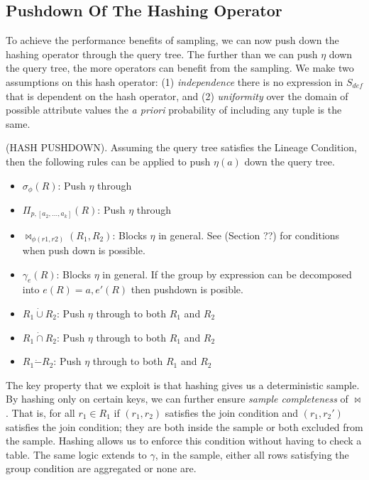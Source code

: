 \subsection{Pushdown Of The Hashing Operator}
To achieve the performance benefits of sampling, we can now push down the hashing operator through the query tree.
The further than we can push $\eta$ down the query tree, the more operators can benefit from the sampling.
We make two assumptions on this hash operator: (1) \emph{independence} there is no expression in $S_{def}$ that is dependent on the hash operator, and (2) \emph{uniformity} over the domain of possible attribute values the \emph{a priori} probability of including any tuple is the same.

\begin{proposition}
(HASH PUSHDOWN). Assuming the query tree satisfies the Lineage Condition, then the following rules can be applied to push $\eta(a)$ down the query tree. 
\begin{itemize}\vspace{-.45em}
\item $\sigma_{\phi}(R)$: Push $\eta$ through \vspace{-.45em}
\item $\Pi_{p,[a_2,...,a_k]}(R)$: Push $\eta $ through \vspace{-.45em}
\item $\bowtie_{\phi (r1,r2)}(R_1,R_2)$: Blocks $\eta $ in general. See (Section ??) for conditions when push down is possible.
\item $\gamma_{e}(R)$: Blocks $\eta$ in general. If the group by expression can be decomposed into $e(R) = a, e'(R)$ then pushdown is posible.\vspace{-.45em}
\item $R_1 \dot{\cup} R_2$: Push $\eta $ through to both $R_1$ and $R_2$
\item $R_1 \dot{\cap} R_2$: Push $\eta $ through to both $R_1$ and $R_2$
\item $R_1 \dot{-} R_2$: Push $\eta $ through to both $R_1$ and $R_2$
\end{itemize}
\end{proposition}

The key property that we exploit is that hashing gives us a deterministic sample.
By hashing only on certain keys, we can further ensure \emph{sample completeness} of $\bowtie$.
That is, for all $r_1\in R_1$ if $(r_1,r_2)$ satisfies the join condition and $(r_1,r_2')$ satisfies the join condition; they are both inside the sample or both excluded from the sample. 
Hashing allows us to enforce this condition without having to check a table.
The same logic extends to $\gamma$, in the sample, either all rows satisfying the group condition are aggregated or none are.


